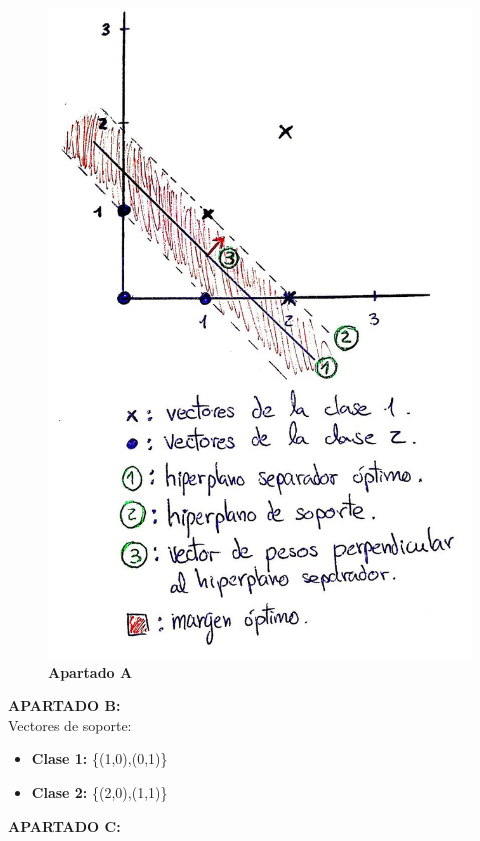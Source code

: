 \begin{figure}[H]
	\centering
	\includegraphics[scale=0.35]{imagenes/ej4} 
	\caption{\textbf{Apartado A}} \label{etiq}
\end{figure}

\textbf{APARTADO B:}\\
Vectores de soporte:
\begin{itemize}
	\item \textbf{Clase 1:} \{(1,0),(0,1)\}
	\item \textbf{Clase 2:} \{(2,0),(1,1)\}
\end{itemize}

\textbf{APARTADO C:}\\

\newpage

